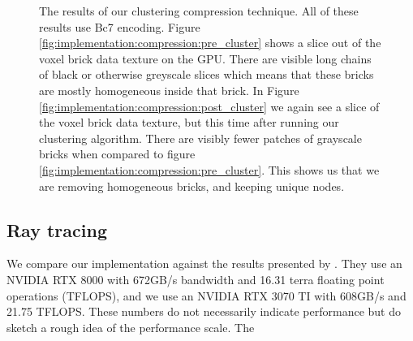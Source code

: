 \begin{figure}[H]
    \centering
    \hfill
    \caption{The results of our clustering compression technique. All of these results use Bc7 encoding. Figure \ref{fig:implementation:compression:pre_cluster} shows a slice out of the voxel brick data texture on the GPU. There are visible long chains of black or otherwise greyscale slices which means that these bricks are mostly homogeneous inside that brick. In Figure \ref{fig:implementation:compression:post_cluster} we again see a slice of the voxel brick data texture, but this time after running our clustering algorithm. There are visibly fewer patches of grayscale bricks when compared to figure \ref{fig:implementation:compression:pre_cluster}. This shows us that we are removing homogeneous bricks, and keeping unique nodes.} \label{fig:implementation:compression:cluster}
\end{figure}

\subsection{Ray tracing} \label{results:ray_tracing}
We compare our implementation against the results presented by \cite{NanoVDBBenchmark}. They use an NVIDIA RTX 8000 with 672GB/s bandwidth and 16.31 terra floating point operations (TFLOPS), and we use an NVIDIA RTX 3070 TI with 608GB/s and 21.75 TFLOPS. These numbers do not necessarily indicate performance but do sketch a rough idea of the performance scale. The 

